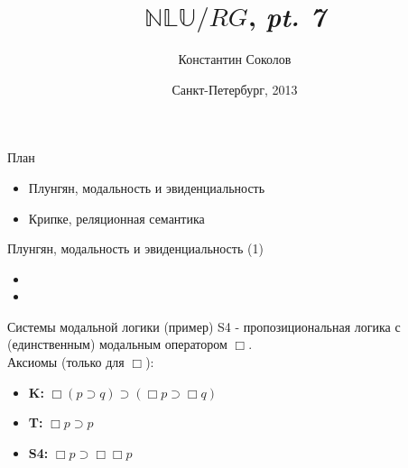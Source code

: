 \documentclass{beamer}
\begin{document}
\title{\huge{$\mathbb{NLU}/RG$, \textit{pt. 7}}}
\author{Константин Соколов}
\date{Санкт-Петербург, 2013} 
\begin{frame}
    \thispagestyle{empty}
    \titlepage
\end{frame}

\begin{frame}{План}
    \setcounter{framenumber}{1}
    \begin{itemize}
        \item Плунгян, модальность и эвиденциальность
        \item Крипке, реляционная семантика
    \end{itemize}
\end{frame}

\begin{frame}{Плунгян, модальность и эвиденциальность (1)}
\begin{itemize}
  \item 
  \item 
\end{itemize}
\end{frame}

\begin{frame}{Системы модальной логики (пример)}
S4 - пропозициональная логика с (единственным) модальным оператором $\Box$.\\
\bigskip
Аксиомы (только для $\Box$):
\begin{itemize}
  \item \textbf{K:} $\Box (p \supset q) \supset ( \Box p \supset \Box q)$
  \item \textbf{T:} $\Box p \supset p$
  \item \textbf{S4:} $\Box p \supset \Box \Box p$
\end{itemize}
\end{frame}
\end{document}

